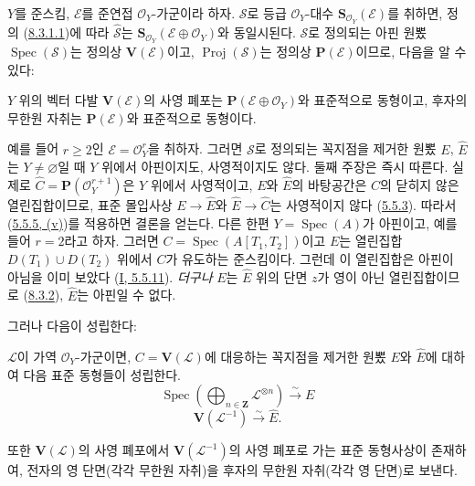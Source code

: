 \begin{env}[8.4.1]
\label{II.8.4.1-ko}
$Y$를 준스킴, $\mathcal{E}$를 준연접 $\mathcal{O}_Y$-가군이라
하자. $\mathcal{S}$로 등급 $\mathcal{O}_Y$-대수
$\mathbf{S}_{\mathcal{O}_Y}(\mathcal{E})$를 취하면, 정의
(\hyperref[II.8.3.1.1-ko]{8.3.1.1})에 따라
$\widehat{\mathcal{S}}$는
$\mathbf{S}_{\mathcal{O}_Y}(\mathcal{E}\oplus\mathcal{O}_Y)$와 동일시된다.
$\mathcal{S}$로 정의되는 아핀 원뽔
$\operatorname{Spec}(\mathcal{S})$는 정의상
$\mathbf{V}(\mathcal{E})$이고, $\operatorname{Proj}(\mathcal{S})$는 정의상
$\mathbf{P}(\mathcal{E})$이므로, 다음을 알 수 있다:
\end{env}

\begin{proposition}[8.4.2]
\label{II.8.4.2-ko}
$Y$ 위의 벡터 다발 $\mathbf{V}(\mathcal{E})$의 사영 폐포는
$\mathbf{P}(\mathcal{E}\oplus\mathcal{O}_Y)$와 표준적으로 동형이고,
후자의 무한원 자취는 $\mathbf{P}(\mathcal{E})$와 표준적으로 동형이다.
\end{proposition}

\begin{remark}[8.4.3]
\label{II.8.4.3-ko}
예를 들어 $r\geq2$인 $\mathcal{E}=\mathcal{O}_Y^r$을 취하자. 그러면
$\mathcal{S}$로 정의되는 꼭지점을 제거한 원뽔 $E$, $\widehat{E}$는
$Y\neq\varnothing$일 때 $Y$ 위에서 아핀이지도, 사영적이지도 않다.
둘째 주장은 즉시 따른다. 실제로
$\widehat{C}=\mathbf{P}(\mathcal{O}_Y^{r+1})$은 $Y$ 위에서 사영적이고,
$E$와 $\widehat{E}$의 바탕공간은 $\widehat{C}$의 닫히지 않은
열린집합이므로, 표준 몰입사상
$E\to\widehat{E}$와 $\widehat{E}\to\widehat{C}$는 사영적이지 않다
(\hyperref[II.5.5.3-ko]{5.5.3}). 따라서
(\hyperref[II.5.5.5-ko]{5.5.5, (v)})를 적용하면 결론을 얻는다.
다른 한편 $Y=\operatorname{Spec}(A)$가 아핀이고, 예를 들어
$r=2$라고 하자. 그러면
$C=\operatorname{Spec}(A[T_1,T_2])$이고 $E$는 열린집합
$D(T_1)\cup D(T_2)$ 위에서 $C$가 유도하는 준스킴이다. 그런데
이 열린집합은 아핀이 아님을 이미 보았다
(\hyperref[I.5.5.11-ko]{I, 5.5.11}). \emph{더구나} $E$는
$\widehat{E}$ 위의 단면 $z$가 영이 아닌 열린집합이므로
(\hyperref[II.8.3.2-ko]{8.3.2}), $\widehat{E}$는 아핀일 수 없다.

그러나 다음이 성립한다:
\end{remark}

\begin{proposition}[8.4.4]
\label{II.8.4.4-ko}
$\mathcal{L}$이 가역 $\mathcal{O}_Y$-가군이면,
$C=\mathbf{V}(\mathcal{L})$에 대응하는 꼭지점을 제거한 원뽔
$E$와 $\widehat{E}$에 대하여 다음 표준 동형들이 성립한다.
\begin{equation}
\label{II.8.4.4.1-ko}
  \operatorname{Spec}\left(
    \bigoplus_{n\in\mathbf{Z}}\mathcal{L}^{\otimes n}
  \right)\xrightarrow{\sim}E
\tag{8.4.4.1}
\end{equation}
\begin{equation}
\label{II.8.4.4.2-ko}
  \mathbf{V}(\mathcal{L}^{-1})\xrightarrow{\sim}\widehat{E}.
\tag{8.4.4.2}
\end{equation}

또한 $\mathbf{V}(\mathcal{L})$의 사영 폐포에서
$\mathbf{V}(\mathcal{L}^{-1})$의 사영 폐포로 가는 표준 동형사상이
존재하여, 전자의 영 단면(각각 무한원 자취)을 후자의 무한원
자취(각각 영 단면)로 보낸다.
\end{proposition}


